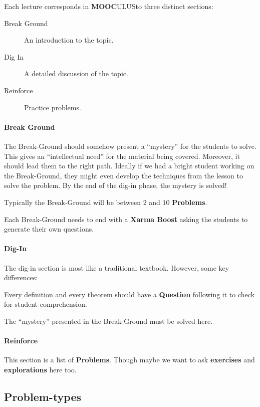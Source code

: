 \documentclass{article}
\newcommand{\mooculus}{\textsf{\textbf{MOOC}\textnormal{\textsf{ULUS}}}}
\begin{document}
Each lecture corresponds in \mooculus to three distinct sections:
\begin{description}
\item[Break Ground] An introduction to the topic.
\item[Dig In] A detailed discussion of the topic.
\item[Reinforce] Practice problems.
\end{description}

\paragraph{Break Ground}

The Break-Ground should somehow present a ``mystery'' for the students
to solve.  This gives an ``intellectual need'' for the material being
covered. Moreover, it should lead them to the right path. Ideally if
we had a bright student working on the Break-Ground, they might even develop
the techniques from the lesson to solve the problem.  By the end of
the dig-in phase, the mystery is solved!

Typically the Break-Ground will be between $2$ and $10$ \textbf{Problems}.

Each Break-Ground needs to end with a \textbf{Xarma Boost} asking the
students to generate their own questions.


\paragraph{Dig-In}


The dig-in section is most like a traditional textbook. However, some
key differences:


Every definition and every theorem should have a \textbf{Question}
following it to check for student comprehension.


The ``mystery'' presented in the Break-Ground must be solved here. 



\paragraph{Reinforce}

This section is a list of \textbf{Problems}. Though maybe we want to
ask \textbf{exercises} and \textbf{explorations} here too.



\subsection*{Problem-types}
\end{document}

